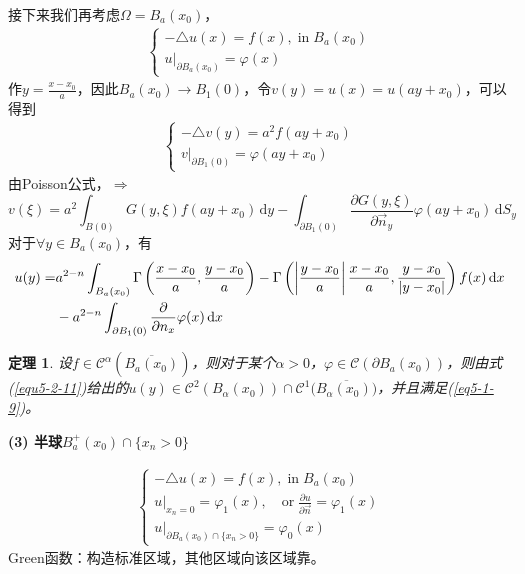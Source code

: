 \documentclass[11pt, a4paper]{article}
\theoremstyle{theorem}
\newtheorem{thm}{定理}[section]
\newcommand{\intd}[1]{\,\mathrm{d}{#1}}
\begin{document}
接下来我们再考虑$\Omega = B_a(x_0)$，
\begin{align*}
    \begin{cases}
        - \triangle u(x) = f(x), \; \text{in} \; B_a(x_0) \\
        u \bigg|_{\partial B_a(x_0)} = \varphi(x)
    \end{cases}
\end{align*}
作$y = \frac{x - x_0}{a}$，因此$B_a(x_0) \rightarrow B_1(0)$，令$v(y) = u(x) = u(a y + x_0)$，可以得到
\begin{align*}
    \begin{cases}
        - \triangle v(y) = a^2 f(a y + x_0) \\
        v \bigg|_{\partial B_1(0)} = \varphi(a y + x_0)
    \end{cases}
\end{align*}
由Poisson公式，$\Rightarrow$
$$
v(\xi) = a^2 \int_{B(0)} G(y, \xi)  f(ay + x_0) \intd y - \int_{\partial B_1(0)} \frac{\partial G(y,\xi)}{\partial \vec{n}_y} \varphi(ay + x_0) \intd S_y
$$
对于$\forall y \in B_a(x_0)$，有
\begin{align}
\label{equ5-2-11}
    u(y) = &a^{2-n} \int_{B_a(x_0)} \Gamma\left(\frac{x - x_0}{a}, \frac{y - x_0}{a}\right) - \Gamma\left(\left|\frac{y - x_0}{a}\right| \frac{x - x_0}{a}, \frac{y - x_0}{|y - x_0|}\right) f(x) \intd x \notag \\
    &- a^{2-n} \int_{\partial B_1(0)} \frac{\partial }{\partial n_x} \varphi(x) \intd x
\end{align}
\begin{thm}
\label{thm5-2-9}
    设$f \in \mathcal{C}^\alpha(\overline{B_a(x_0)})$，则对于某个$\alpha > 0$，$\varphi \in \mathcal{C}(\partial B_a(x_0))$，则由式(\ref{equ5-2-11})给出的$u(y) \in \mathcal{C}^2(B_\alpha(x_0)) \cap \mathcal{C}^1(\overline{B_\alpha(x_0))}$，并且满足(\ref{eq5-1-9})。
\end{thm}

\textbf{(3) 半球$B^+_a(x_0) \cap \{x_n > 0\}$}

\begin{align*}
    \begin{cases}
        - \triangle u(x) = f(x), \; \text{in} \; B_a(x_0) \\
        u\bigg|_{x_n = 0} = \varphi_1(x), \quad \text{or} \; \frac{\partial u}{\partial \vec{n}} = \varphi_1(x)\\
        u \bigg|_{\partial B_a(x_0) \cap \{x_n > 0\}} = \varphi_0(x)
    \end{cases}
\end{align*}
Green函数：构造标准区域，其他区域向该区域靠。
\end{document}
